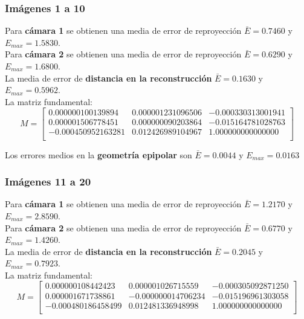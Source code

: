 \documentclass[a4paper, fontsize=11pt]{scrartcl} %
\numberwithin{equation}{section} %
\numberwithin{figure}{section} %
\numberwithin{table}{section} %
\begin{document}
	\subsubsection*{Imágenes 1 a 10}
	
	Para \textbf{cámara 1} se obtienen una media de error de reproyección $\bar{E} = 0.7460$ y $E_{max} = 1.5830$.\\
	Para \textbf{cámara 2} se obtienen una media de error de reproyección $\bar{E} = 0.6290$ y $E_{max} = 1.6800$.\\
	
	La media de error de \textbf{distancia en la reconstrucción} $\bar{E} = 0.1630$ y $E_{max} = 0.5962$.\\
	La matriz fundamental:
	\[
	M=
	\begin{bmatrix}
	0.000000100139894&	0.000001231096506&	-0.000330313001941 \\
	0.000001506778451&	0.000000090203864&	-0.015164781028763 \\
	-0.000450952163281&	0.012426989104967&	1.000000000000000  \\
	
	\end{bmatrix}
	\]
	
	Los errores medios en la \textbf{geometría epipolar} son $\bar{E} = 0.0044$ y $E_{max} = 0.0163$
	
	\subsubsection*{Imágenes 11 a 20}
	
	Para \textbf{cámara 1} se obtienen una media de error de reproyección $\bar{E} = 1.2170$ y $E_{max} = 2.8590$.\\
	Para \textbf{cámara 2} se obtienen una media de error de reproyección $\bar{E} = 0.6770$ y $E_{max} = 1.4260$.\\
	
	La media de error de \textbf{distancia en la reconstrucción} $\bar{E} = 0.2045$ y $E_{max} = 0.7923$.\\
	La matriz fundamental:
	\[
	M=
	\begin{bmatrix}
	0.000000108442423&	0.000001026715559&	-0.000305092871250 \\
	0.000001671738861&	-0.000000014706234&	-0.015196961303058 \\
	-0.000480186458499&	0.012481336948998&	1.000000000000000  \\
	
	\end{bmatrix}
	\]
	
\end{document}
